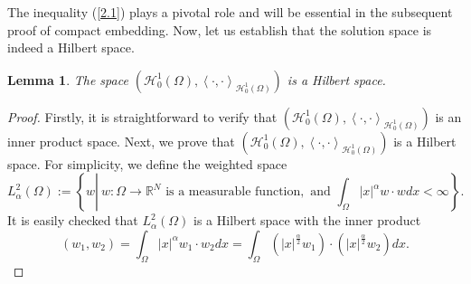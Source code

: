 \documentclass[11pt]{article}
\def\dref#1{(\ref{#1})}
\newtheorem{lemma}{Lemma}[section]
\numberwithin{equation}{section}
\def\dref#1{(\ref{#1})}
\def\ra{\rightarrow}
\def\mb{\mathbb}
\def\Om{\Omega}
\def\mcH{\mathcal{H}}
\begin{document}
		The inequality \dref{2.1} plays a pivotal role and will be essential in the subsequent proof of compact embedding. Now, let us establish that the solution space is indeed a Hilbert space.
		
		
		\begin{lemma}\label{HS}	
			The space $(\mcH_0^1(\Omega),\left\langle \cdot,\cdot\right\rangle _{\mcH_0^1(\Omega)})$ is a Hilbert space.
		\end{lemma}
		
		\begin{proof}	
			Firstly, it is straightforward to verify that  $(\mcH_0^1(\Omega),\left\langle \cdot,\cdot\right\rangle_{\mcH_0^1(\Omega)})$ is an inner product space. 			Next, we prove that
			$(\mcH_0^1(\Omega),\left\langle \cdot,\cdot\right\rangle_{\mcH_0^1(\Omega)})$  is a Hilbert space. For simplicity, we define the weighted space
			\begin{equation*}
				L_\alpha^2(\Om):=\left\lbrace w\left|\ \! w: \Om\ra \mb{R}^N \mbox{ is a measurable function}, \mbox{ and } \int_{\Om} |x|^\alpha   w\cdot w dx  < \infty\right. \right\rbrace.
			\end{equation*}
			It is easily checked that $L_\alpha^2(\Om)$ is a Hilbert space with the inner product
			\begin{equation*}
				(w_1,w_2)=\int_\Om |x|^\alpha  w_1\cdot w_2dx=\int_\Om \left(|x|^\frac{\alpha}{2} w_1\right)\cdot\left(|x|^\frac{\alpha}{2}w_2\right)dx.
			\end{equation*}
			

\end{proof}
\end{document}
